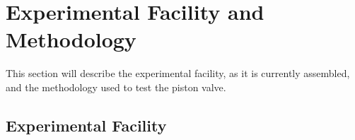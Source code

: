 \section{Experimental Facility and Methodology} \label{s:experiment}

This section will describe the experimental facility, as it is currently assembled, and the methodology used to test the piston valve.



\subsection{Experimental Facility} \label{ss:facility}

